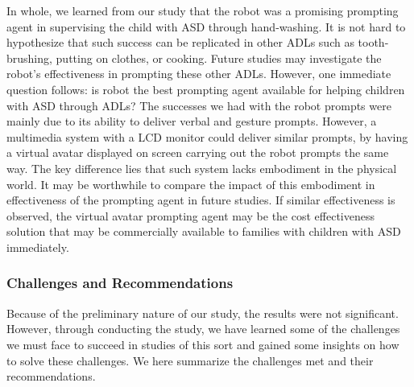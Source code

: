 In whole, we learned from our study that the robot was a promising prompting agent in supervising the child with ASD through hand-washing.  It is not hard to hypothesize that such success can be replicated in other ADLs such as tooth-brushing, putting on clothes, or cooking.  Future studies may investigate the robot's effectiveness in prompting these other ADLs.  However, one immediate question follows: is robot the best prompting agent available for helping children with ASD through ADLs?  The successes we had with the robot prompts were mainly due to its ability to deliver verbal and gesture prompts.  However, a multimedia system with a LCD monitor could deliver similar prompts, by having a virtual avatar displayed on screen carrying out the robot prompts the same way.  The key difference lies that such system lacks embodiment in the physical world.  It may be worthwhile to compare the impact of this embodiment in effectiveness of the prompting agent in future studies.  If similar effectiveness is observed, the virtual avatar prompting agent may be the cost effectiveness solution that may be commercially available to families with children with ASD immediately.


\subsubsection{Challenges and Recommendations}
Because of the preliminary nature of our study, the results were not significant.  However, through conducting the study, we have learned some of the challenges we must face to succeed in studies of this sort and gained some insights on how to solve these challenges.  We here summarize the challenges met and their recommendations.

